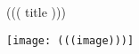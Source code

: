 \documentclass{article}
\begin{document}
((( title )))

\texttt{[image: (((image)))]}
\end{document}

